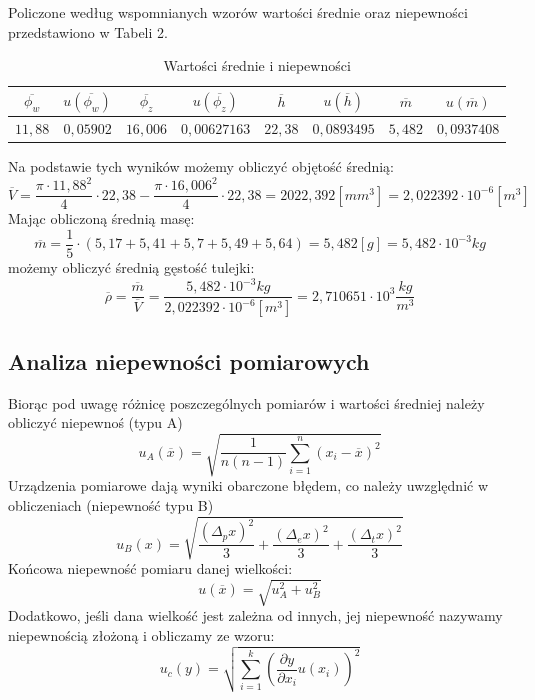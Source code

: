 \documentclass{article}
\begin{document}
Policzone według wspomnianych wzorów wartości średnie oraz niepewności przedstawiono w Tabeli 2.
\begin{table}[]
    \centering
    \begin{tabular}{c|c|c|c|c|c|c|c}
        $\overline{\phi_w}$ & $u(\overline{\phi_w})$ & $\overline{\phi_z}$ & $u(\overline{\phi_z})$ & $\overline{h}$ & $u(\overline{h})$ & $\overline{m}$ & $u(\overline{m})$ \\ \hline
        $11,88$ & $0,05902$ & $16,006$ & $0,00627163$ & $22,38$ & $0,0893495$ & $5,482$ & $0,0937408 $
    \end{tabular}
    \caption{Wartości średnie i niepewności}
    \label{tab:my_label}
\end{table}
Na podstawie tych wyników możemy obliczyć objętość średnią:
\begin{equation*}
    \overline{V} = \frac{\pi \cdot 11,88^2}{4} \cdot 22,38 - \frac{\pi \cdot 16,006^2}{4}\cdot 22,38 = 2022,392 [mm^3] = 2,022392 \cdot 10^{-6} [m^3]
\end{equation*}
Mając obliczoną średnią masę:
\begin{equation*}
    \overline{m} = \frac{1}{5} \cdot (5,17 + 5,41 + 5,7 + 5,49 + 5,64) = 
     5,482 [g] = 5,482 \cdot 10^{-3} kg
\end{equation*}
możemy obliczyć średnią gęstość tulejki:
\begin{equation*}
    \overline{\rho} = \frac{\overline{m}}{\overline{V}} = \frac{5,482 \cdot 10^{-3} kg}{2,022392 \cdot 10^{-6}[m^3]} = 2,710651 \cdot 10^3 \frac{kg}{m^3}
\end{equation*}

\subsection{Analiza niepewności pomiarowych}
Biorąc pod uwagę różnicę poszczególnych pomiarów i wartości średniej należy obliczyć niepewnoś (typu A)
    $$u_A(\overline{x}) = \sqrt{\frac{1}{n(n-1)}\sum_{i=1}^n (x_i-\overline{x})^2} $$
Urządzenia pomiarowe dają wyniki obarczone błędem, co należy uwzględnić w obliczeniach (niepewność typu B)
    $$u_B(x) = \sqrt{\frac{(\Delta_px)^2}{3} + \frac{(\Delta_ex)^2}{3} + \frac{(\Delta_tx)^2}{3} } $$
Końcowa niepewność pomiaru danej wielkości:
    $$u(\overline{x}) = \sqrt{u_A^2 + u_B^2 }$$
Dodatkowo, jeśli dana wielkość jest zależna od innych, jej niepewność nazywamy niepewnością złożoną i obliczamy ze wzoru:
\begin{equation*}
    u_c(y) = \sqrt{\sum_{i=1}^k \left( \frac{\partial y}{\partial x_i} u(x_i)\right)^2}
\end{equation*}
\end{document}
